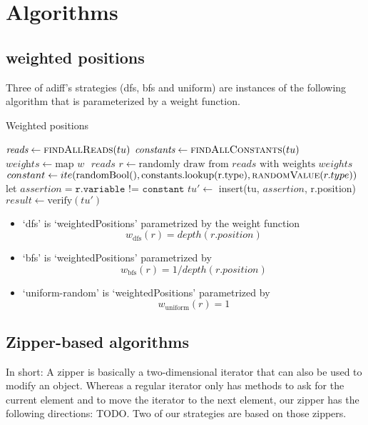 \documentclass{article}
\begin{document}
\section{Algorithms}

\subsection{weighted positions}
Three of adiff's strategies (dfs, bfs and uniform) are instances of the following
algorithm that is parameterized by a weight function.

\begin{algorithm}
  \caption{Weighted positions}
  \begin{algorithmic}
  \State $\textit{reads} \gets \Call{findAllReads}{tu}$
  \State $\textit{constants} \gets \Call{findAllConstants}{tu}$
  \State $\textit{weights} \gets \text{map $w$ $reads$} $
      \State $r \gets \text{randomly draw from $reads$ with weights $weights$}$
      \State $constant \gets ite(\text{randomBool()}
      , \text{constants.lookup(r.type)}
      , \Call{randomValue}{r.type})$
      \State let $assertion = \texttt{r.variable != constant}$ 
      \State $tu' \gets$ insert(tu, $assertion$, r.position)
      \State $result \gets \text{verify}(tu')$
  \EndFor
  \EndProcedure
\end{algorithmic}
\end{algorithm}
\begin{itemize}
\item `dfs' is `weightedPositions' parametrized by the weight function
  \[
    w_{\text{dfs}}(r) = depth (r.position)
  \]
\item `bfs' is `weightedPositions' parametrized by
  \[
    w_{\text{bfs}}(r) =  1 / depth(r.position)
  \]
\item `uniform-random' is `weightedPositions' parametrized by
  \[
    w_{\text{uniform}}(r) = 1
  \]
\end{itemize}

\newpage
\subsection{Zipper-based algorithms}
In short: A zipper is basically a two-dimensional iterator that can also be used
to modify an object. Whereas a regular iterator only has methods to ask for the
current element and to move the iterator to the next element, our zipper has the
following directions: TODO.
Two of our strategies are based on those zippers.
\end{document}
